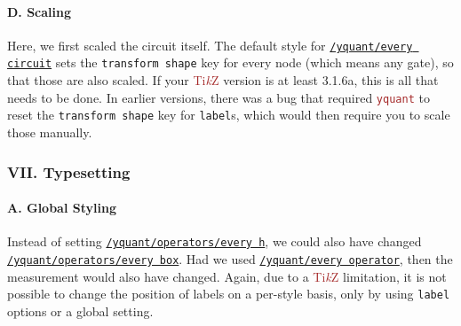 \documentclass{scrartcl}
\makeatletter
\newenvironment{codeexample*}{%
   \VerbatimEnvironment%
   \let\FVB@VerbatimOut\minted@FVB@VerbatimOut
   \let\FVE@VerbatimOut\minted@FVE@VerbatimOut
   \minted@configlang{tex}%
   \minted@fvset
   \begin{VerbatimOut}[codes={\catcode`\^^I=12},firstline,lastline]{\minted@jobname.pyg}%
}{
   \end{VerbatimOut}%
   \minted@langlinenoson%
   \begin{adjustbox}{center}
       \minted@jobname.pyg %
   \end{adjustbox}\nopagebreak
   \minted@pygmentize{\minted@lang}%
   \minted@langlinenosoff%
   \par%
}
\def\TikZ{\textcolor{brown}{Ti\textit kZ}}
\def\pkg#1{\textcolor{brown}{\texttt{#1}}}
\def\style#1{\hyperref[style:#1]{\texttt{#1}}}
\def\Yquant{\pkg{yquant}}
\makeatother
\begin{document}
            \paragraph{D. Scaling}\leavevmode
               \begin{example}
                  \begin{codeexample*}
                  \end{codeexample*}
                  Here, we first scaled the circuit itself.
                  The default style for \style{/yquant/every circuit} sets the \texttt{transform shape} key for every node (which means any gate), so that those are also scaled.
                  If your \TikZ{} version is at least 3.1.6a, this is all that needs to be done.
                  In earlier versions, there was a bug that required \Yquant{} to reset the \texttt{transform shape} key for \texttt{label}s, which would then require you to scale those manually.
               \end{example}

         \clearpage
         \subsubsection{VII. Typesetting}
            \paragraph{A. Global Styling}\leavevmode
               \begin{example}
                  \begin{codeexample*}
                  \end{codeexample*}
                  Instead of setting \style{/yquant/operators/every h}, we could also have changed \style{/yquant/operators/every box}.
                  Had we used \style{/yquant/every operator}, then the measurement would also have changed.
                  Again, due to a \TikZ{} limitation, it is not possible to change the position of labels on a per\hyp style basis, only by using \texttt{label} options or a global setting.
               \end{example}
\end{document}
